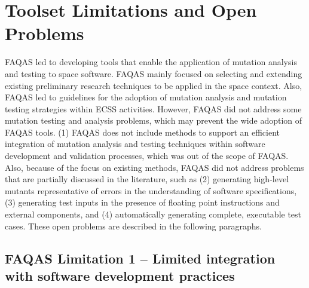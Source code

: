 
\chapter{Toolset Limitations and Open Problems}
\label{sec:limitations}

FAQAS led to developing tools that enable the application of mutation analysis and testing to space software. FAQAS mainly focused on selecting and extending existing preliminary research techniques to be applied in the space context. Also, FAQAS led to guidelines for the adoption of mutation analysis and mutation testing strategies within ECSS activities. However, FAQAS did not address some mutation testing and analysis problems, which may prevent the wide adoption of FAQAS tools. (1) FAQAS does not include methods to support an efficient integration of mutation analysis and testing techniques within software development and validation processes, which was out of the scope of FAQAS. Also, because of the focus on existing methods, FAQAS did not address problems that are partially discussed in the literature, such as (2) generating high-level mutants representative of errors in the understanding of software specifications, (3) generating test inputs in the presence of floating point instructions and external components, and (4) automatically generating complete, executable test cases. These open problems are described in the following paragraphs.


\section*{FAQAS Limitation 1 – Limited integration with software development practices}

